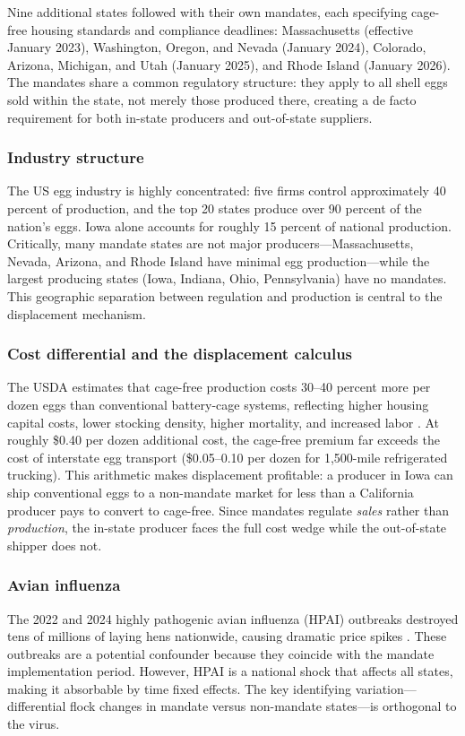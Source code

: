 \documentclass[12pt]{article}
\begin{document}
Nine additional states followed with their own mandates, each specifying cage-free housing standards and compliance deadlines: Massachusetts (effective January 2023), Washington, Oregon, and Nevada (January 2024), Colorado, Arizona, Michigan, and Utah (January 2025), and Rhode Island (January 2026). The mandates share a common regulatory structure: they apply to all shell eggs sold within the state, not merely those produced there, creating a de facto requirement for both in-state producers and out-of-state suppliers.

\subsubsection*{Industry structure} The US egg industry is highly concentrated: five firms control approximately 40 percent of production, and the top 20 states produce over 90 percent of the nation's eggs. Iowa alone accounts for roughly 15 percent of national production. Critically, many mandate states are not major producers---Massachusetts, Nevada, Arizona, and Rhode Island have minimal egg production---while the largest producing states (Iowa, Indiana, Ohio, Pennsylvania) have no mandates. This geographic separation between regulation and production is central to the displacement mechanism.

\subsubsection*{Cost differential and the displacement calculus} The USDA estimates that cage-free production costs 30--40 percent more per dozen eggs than conventional battery-cage systems, reflecting higher housing capital costs, lower stocking density, higher mortality, and increased labor \citep{sumner2011economic, mullally2018cage}. At roughly \$0.40 per dozen additional cost, the cage-free premium far exceeds the cost of interstate egg transport (\$0.05--0.10 per dozen for 1,500-mile refrigerated trucking). This arithmetic makes displacement profitable: a producer in Iowa can ship conventional eggs to a non-mandate market for less than a California producer pays to convert to cage-free. Since mandates regulate \textit{sales} rather than \textit{production}, the in-state producer faces the full cost wedge while the out-of-state shipper does not.

\subsubsection*{Avian influenza} The 2022 and 2024 highly pathogenic avian influenza (HPAI) outbreaks destroyed tens of millions of laying hens nationwide, causing dramatic price spikes \citep{weaber2024egg}. These outbreaks are a potential confounder because they coincide with the mandate implementation period. However, HPAI is a national shock that affects all states, making it absorbable by time fixed effects. The key identifying variation---differential flock changes in mandate versus non-mandate states---is orthogonal to the virus.
\end{document}
